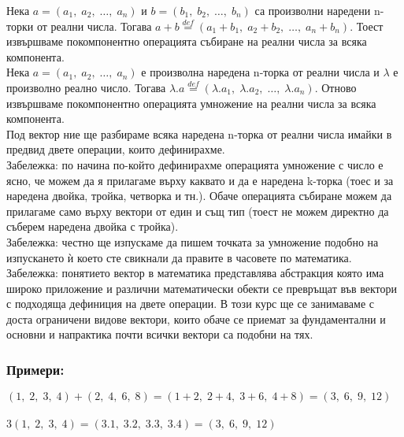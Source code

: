 \documentclass[12pt]{article}
\begin{document}
Нека $a = (a_1, \; a_2, \; \dots, \; a_n)$ и $b = (b_1, \; b_2, \; \dots, \; b_n)$ са произволни наредени n-торки от реални числа. Тогава
$a + b \overset{def}{=} (a_1 + b_1, \; a_2 + b_2, \; \dots, \; a_n + b_n)$. Тоест извършваме покомпонентно операцията събиране на реални числа за всяка компонента. \\

Нека $a = (a_1, \; a_2, \; \dots, \; a_n)$ е произволна наредена n-торка от реални числа и $\lambda$ е произволно реално число. Тогава
$\lambda.a \overset{def}{=} (\lambda.a_1, \; \lambda.a_2, \; \dots, \; \lambda.a_n)$. Отново извършваме покомпонентно операцията умножение на реални числа за всяка компонента. \\

Под вектор ние ще разбираме всяка наредена n-торка от реални числа имайки в предвид двете операции, които дефинирахме.\\

Забележка: по начина по-който дефинирахме операцията умножение с число е ясно, че можем да я прилагаме върху каквато и да е
наредена k-торка (тоес и за наредена двойка, тройка, четворка и тн.). Обаче операцията събиране можем да прилагаме само върху
вектори от един и същ тип (тоест не можем директно да съберем наредена двойка с тройка). \\

Забележка: честно ще изпускаме да пишем точката за умножение подобно на изпускането ѝ което сте свикнали да правите в часовете по математика. \\

Забележка: понятието вектор в математика представлява абстракция която има широко приложение и различни математически обекти се превръщат във вектори с подходяща
дефиниция на двете операции. В този курс ще се занимаваме с доста ограничени видове вектори, които обаче се приемат за фундаментални и основни и напрактика почти
всички вектори са подобни на тях.

\subsubsection*{Примери:}

$(1, \; 2, \; 3, \; 4) + (2, \; 4, \; 6, \; 8) = (1 + 2, \; 2 + 4, \; 3 + 6, \; 4 + 8) = (3, \; 6, \; 9, \; 12)$ \\\\

$3(1, \; 2, \; 3, \; 4) = (3.1, \; 3.2, \; 3.3, \; 3.4) = (3, \; 6, \; 9, \; 12)$
\end{document}
